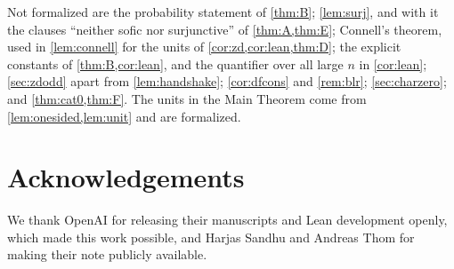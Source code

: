 \documentclass[11pt]{article}
\theoremstyle{definition}
\theoremstyle{plain}
\begin{document}
Not formalized are the probability statement of \cref{thm:B}; \cref{lem:surj}, and with it the clauses ``neither sofic nor surjunctive'' of \cref{thm:A,thm:E}; Connell's theorem, used in \cref{lem:connell} for the units of \cref{cor:zd,cor:lean,thm:D}; the explicit constants of \cref{thm:B,cor:lean}, and the quantifier over all large $n$ in \cref{cor:lean}; \cref{sec:zdodd} apart from \cref{lem:handshake}; \cref{cor:dfcons} and \cref{rem:blr}; \cref{sec:charzero}; and \cref{thm:cat0,thm:F}. The units in the Main Theorem come from \cref{lem:onesided,lem:unit} and are formalized.

\FloatBarrier
\section*{Acknowledgements}
We thank OpenAI for releasing their manuscripts and Lean development openly, which made this work possible, and Harjas Sandhu and Andreas Thom for making their note publicly available.
\end{document}
